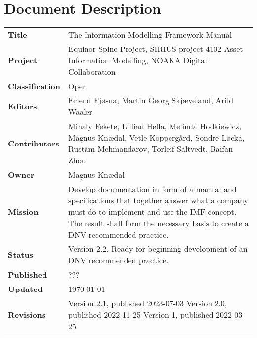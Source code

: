 \documentclass[../main.tex]{subfiles}
\begin{document}
\chapter{Document Description}


\begingroup

\setlength{\tabcolsep}{8pt} %
\renewcommand{\arraystretch}{1.5} %

\begin{tabularx}{\textwidth}{lX}
  \textbf{Title} & The Information Modelling Framework Manual \\
  \textbf{Project} & Equinor Spine Project, SIRIUS project 4102 Asset Information Modelling, NOAKA Digital Collaboration \\
  \textbf{Classification} & Open  \\
  \textbf{Editors} &
  Erlend Fjøsna,
  Martin Georg Skjæveland,
  Arild Waaler
  \\
  \textbf{Contributors} &
  Mihaly Fekete,
  Lillian Hella,
  Melinda Hodkiewicz,
  Magnus Knædal,
  Vetle Koppergård,
  Sondre Løcka,
  Rustam Mehmandarov,
  Torleif Saltvedt,
  Baifan Zhou
  \\
  \textbf{Owner} & Magnus Knædal \\
  \textbf{Mission} & Develop documentation in form of a manual and specifications that together answer
  what a company must do to implement and use the IMF concept. The result shall form the necessary basis to create a
  DNV recommended practice. \\
  \textbf{Status} & Version 2.2. Ready for beginning development of an DNV recommended practice. \\
  \textbf{Published} & ??? \\
  \textbf{Updated} & \today \\
  \textbf{Revisions} &
  Version 2.1, published 2023-07-03\newline
  Version 2.0, published 2022-11-25\newline
  Version 1,   published 2022-03-25
\end{tabularx}

\endgroup
\end{document}

